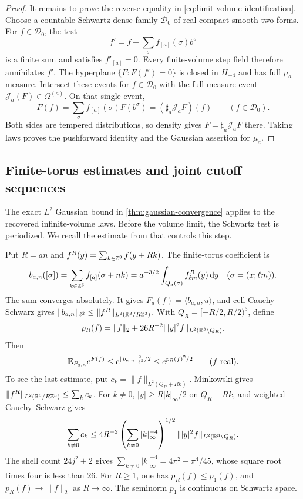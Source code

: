 \begin{proof}
It remains to prove the reverse equality in
\eqref{eq:limit-volume-identification}. Choose a countable
Schwartz-dense family $\mathcal D_0$ of real compact smooth
two-forms. For $f\in\mathcal D_0$, the test
\[
 f'=f-\sum_\sigma f_{[a]}(\sigma)b^\sigma
\]
is a finite sum and satisfies $f'_{[a]}=0$. Every finite-volume
step field therefore annihilates $f'$. The hyperplane
$\{F:F(f')=0\}$ is closed in $H_{-4}$ and has full $\mu_a$
measure. Intersect these events for $f\in\mathcal D_0$ with
the full-measure event
$\mathcal J_a(F)\in\Omega^{(a)}$. On that single event,
\[
 F(f)=\sum_\sigma f_{[a]}(\sigma)F(b^\sigma)
      =(\sharp_a\mathcal J_aF)(f)
 \qquad(f\in\mathcal D_0).
\]
Both sides are tempered distributions, so density gives
$F=\sharp_a\mathcal J_aF$ there. Taking laws proves the
pushforward identity and the Gaussian assertion for $\mu_a$.
\end{proof}

\subsection{Finite-torus estimates and joint cutoff sequences}
\label{subsec:joint-cutoff-sequences}
The exact $L^2$ Gaussian bound in
\cref{thm:gaussian-convergence} applies to the recovered
infinite-volume laws. Before the volume limit, the Schwartz
test is periodized. We recall the estimate from
\cite[Sections~6.1--6.2]{QED3Manuscript} that controls this step.

Put $R=an$ and $f^R(y)=\sum_{k\in\mathbb Z^3}f(y+Rk)$.
The finite-torus coefficient is
\begin{equation}\label{eq:folded-cell-coefficient}
 b_{a,n}([\sigma])
 =\sum_{k\in\mathbb Z^3}f_{[a]}(\sigma+nk)
 =a^{-3/2}\int_{Q_a(\sigma)}f^R_{\ell m}(y)\,\mathrm d y
 \quad(\sigma=(x;\ell m)).
\end{equation}
The sum converges absolutely. It gives
$F_a(f)=\langle b_{a,n},u\rangle$, and cell Cauchy--Schwarz
gives $\|b_{a,n}\|_{\ell^2}\le
\|f^R\|_{L^2(\mathbb R^3/R\mathbb Z^3)}$. With $Q_R=[-R/2,R/2)^3$, define
\begin{equation}\label{eq:limit-periodic-seminorm}
 p_R(f)=\|f\|_2+
        26R^{-2}\||y|^2f\|_{L^2(\mathbb R^3\setminus Q_R)}.
\end{equation}
Then
\begin{equation}\label{eq:limit-cutoff-G}
 \mathbb E_{P_{a,n}}e^{F(f)}
 \le e^{\|b_{a,n}\|_{\ell^2}^2/2}
 \le e^{p_R(f)^2/2}
 \qquad(f\text{ real}).
\end{equation}
To see the last estimate, put
$c_k=\|f\|_{L^2(Q_R+Rk)}$. Minkowski gives
$\|f^R\|_{L^2(\mathbb R^3/R\mathbb Z^3)}\le\sum_kc_k$. For $k\ne0$,
$|y|\ge R|k|_\infty/2$ on $Q_R+Rk$, and weighted
Cauchy--Schwarz gives
\[
 \sum_{k\ne0}c_k
 \le4R^{-2}
   \left(\sum_{k\ne0}|k|_\infty^{-4}\right)^{1/2}
   \||y|^2f\|_{L^2(\mathbb R^3\setminus Q_R)}.
\]
The shell count $24j^2+2$ gives
$\sum_{k\ne0}|k|_\infty^{-4}=4\pi^2+\pi^4/45$,
whose square root times four is less than $26$.
For $R\ge1$, one has $p_R(f)\le p_1(f)$, and
$p_R(f)\to\|f\|_2$ as $R\to\infty$. The seminorm $p_1$
is continuous on Schwartz space.

